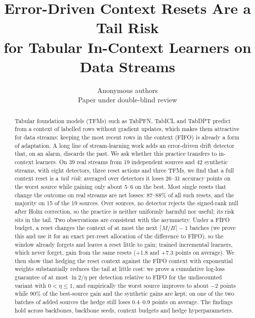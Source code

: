 \documentclass[10pt]{article}
\title{Error-Driven Context Resets Are a Tail Risk\\for Tabular In-Context Learners on Data Streams}
\author{\name Anonymous authors \\
      \addr Paper under double-blind review}
\theoremstyle{definition}
\theoremstyle{remark}
\begin{document}
\maketitle

\begin{abstract}
Tabular foundation models (TFMs) such as TabPFN, TabICL and TabDPT predict from a context of labelled rows without
gradient updates, which makes them attractive for data streams: keeping the most recent rows in the context (FIFO) is
already a form of adaptation. A long line of stream-learning work adds an error-driven drift detector that, on an
alarm, discards the past. We ask whether this practice transfers to in-context learners. On 39 real streams from 19
independent sources and 42 synthetic streams, with eight detectors, three reset actions and three TFMs, we find that a
full context reset is a \emph{tail risk}: averaged over detectors it loses 26--31 accuracy points on the worst source
while gaining only about 5--6 on the best. Most single resets that change the outcome on real streams are net losses:
87--88\% of all such resets, and the majority on 15 of the 19 sources. Over sources, no detector rejects the signed-rank null after Holm correction, so the
practice is neither uniformly harmful nor useful; its risk sits in the tail. Two observations are consistent with the
asymmetry. Under a FIFO budget, a reset changes the context of at most the next $\lceil M/B\rceil-1$ batches (we prove
this and use it for an exact per-reset allocation of the difference to FIFO), so the window already forgets and leaves a
reset little to gain; trained incremental
learners, which never forget, gain from the same resets (+1.8 and +7.3 points on average). We then show that hedging
the reset context against the FIFO context with exponential weights substantially reduces the tail at little cost: we
prove a cumulative log-loss guarantee of at most $\ln 2/\eta$ per detection relative to FIFO for the undiscounted
variant with $0<\eta\le1$, and empirically the worst source improves to about $-2$ points while 90\% of the
best-source gain and the synthetic gains are kept; on one of the two batches of added sources the hedge still loses
0.4--0.9 points on average. The findings hold across
backbones, backbone seeds, context budgets and hedge hyperparameters.
\end{abstract}

\end{document}
